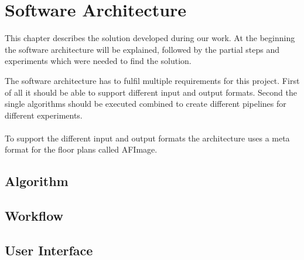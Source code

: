 \section{Software Architecture}
This chapter describes the solution developed during our work. At the beginning the software architecture will be explained, followed by the partial steps and experiments which were needed to find the solution.

The software architecture has to fulfil multiple requirements for this project. First of all it should be able to support different input and output formats. Second the single algorithms should be executed combined to create different pipelines for different experiments.
\\\\
To support the different input and output formats the architecture uses a meta format for the floor plans called AFImage.



\subsection{Algorithm}
\subsection{Workflow}

\subsection{User Interface}

